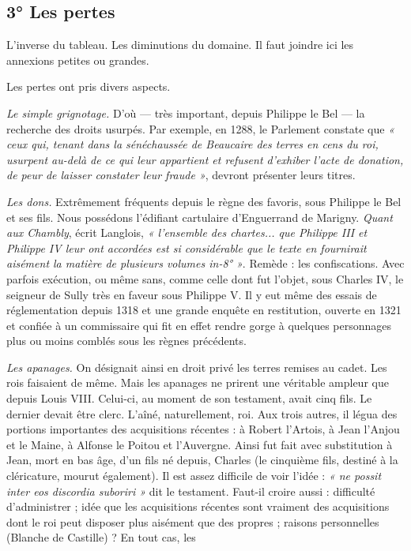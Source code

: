 \documentclass[french,twoside]{book} %
\newcommand{\labelchar}[1]{{\color{rubric}\bf #1}}
\begin{document}
\subsection[3° Les pertes]{3° Les pertes}
\label{c03c3}
\noindent L’inverse du tableau. Les diminutions du domaine. Il faut joindre ici les annexions petites ou grandes.\par
Les pertes ont pris divers aspects.\par
\bigbreak
\noindent \labelchar{a)} {\itshape Le simple grignotage.} D’où — très important, depuis Philippe le Bel — la recherche des droits usurpés. Par exemple, en 1288, le Parlement constate que \emph{« ceux qui, tenant dans la sénéchaussée de Beaucaire des terres en cens du roi, usurpent au-delà de ce qui leur appartient et refusent d’exhiber l’acte de donation, de peur de laisser constater leur fraude »}, devront présenter leurs titres.\par
\bigbreak
\noindent \labelchar{b)} {\itshape Les dons.} Extrêmement fréquents depuis le règne des favoris, sous Philippe le Bel et ses fils. Nous possédons l’édifiant cartulaire d’Enguerrand de Marigny. \emph{Quant aux Chambly}, écrit Langlois, \emph{« l’ensemble des chartes... que Philippe III et Philippe IV leur ont accordées est si considérable que le texte en fournirait aisément la matière de plusieurs volumes in-8° »}. Remède : les confiscations. Avec parfois exécution, ou même sans, comme celle dont fut l’objet, sous Charles IV, le seigneur de Sully très en faveur sous Philippe V. Il y eut même des essais de réglementation depuis 1318 et une grande enquête en restitution, ouverte en 1321 et confiée à un commissaire qui fit en effet rendre gorge à quelques personnages plus ou moins comblés sous les règnes précédents.\par
\bigbreak
\noindent \labelchar{c)} {\itshape Les apanages.} On désignait ainsi en droit privé les terres remises au cadet. Les rois faisaient de même. Mais les apanages ne prirent une véritable ampleur que depuis Louis VIII. Celui-ci, au moment de son testament, avait cinq fils. Le dernier devait être clerc. L’aîné, naturellement, roi. Aux trois autres, il légua des portions importantes des acquisitions récentes : à Robert l’Artois, à Jean l’Anjou et le Maine, à Alfonse le Poitou et l’Auvergne. Ainsi fut fait avec substitution à Jean, mort en bas âge, d’un fils né depuis, Charles (le cinquième fils, destiné à la cléricature, mourut également). Il est assez difficile de voir l’idée : \emph{« ne possit inter eos discordia suboriri »} dit le testament. Faut-il croire aussi : difficulté d’administrer ; idée que les acquisitions récentes sont vraiment des acquisitions dont le roi peut disposer plus aisément que des propres ; raisons personnelles (Blanche de Castille) ? En tout cas, les  
\end{document}
